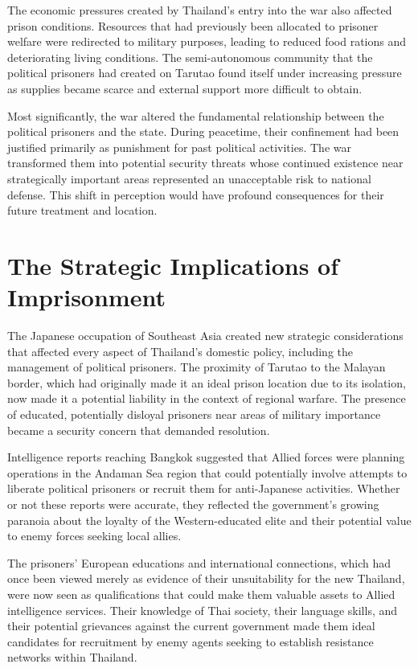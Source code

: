 \documentclass[
  Letterpaper,
]{scrbook}
\begin{document}
The economic pressures created by Thailand's entry into the war also
affected prison conditions. Resources that had previously been allocated
to prisoner welfare were redirected to military purposes, leading to
reduced food rations and deteriorating living conditions. The
semi-autonomous community that the political prisoners had created on
Tarutao found itself under increasing pressure as supplies became scarce
and external support more difficult to obtain.

Most significantly, the war altered the fundamental relationship between
the political prisoners and the state. During peacetime, their
confinement had been justified primarily as punishment for past
political activities. The war transformed them into potential security
threats whose continued existence near strategically important areas
represented an unacceptable risk to national defense. This shift in
perception would have profound consequences for their future treatment
and location.

\section{The Strategic Implications of
Imprisonment}\label{the-strategic-implications-of-imprisonment}

The Japanese occupation of Southeast Asia created new strategic
considerations that affected every aspect of Thailand's domestic policy,
including the management of political prisoners. The proximity of
Tarutao to the Malayan border, which had originally made it an ideal
prison location due to its isolation, now made it a potential liability
in the context of regional warfare. The presence of educated,
potentially disloyal prisoners near areas of military importance became
a security concern that demanded resolution.

Intelligence reports reaching Bangkok suggested that Allied forces were
planning operations in the Andaman Sea region that could potentially
involve attempts to liberate political prisoners or recruit them for
anti-Japanese activities. Whether or not these reports were accurate,
they reflected the government's growing paranoia about the loyalty of
the Western-educated elite and their potential value to enemy forces
seeking local allies.

The prisoners' European educations and international connections, which
had once been viewed merely as evidence of their unsuitability for the
new Thailand, were now seen as qualifications that could make them
valuable assets to Allied intelligence services. Their knowledge of Thai
society, their language skills, and their potential grievances against
the current government made them ideal candidates for recruitment by
enemy agents seeking to establish resistance networks within Thailand.
\end{document}
